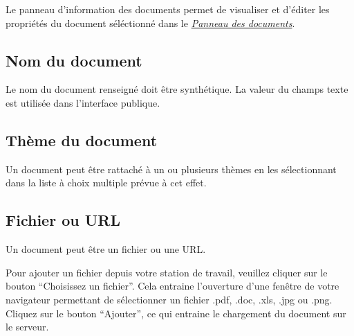 \documentclass[letterpaper,10pt,french]{sphinxmanual}
\begin{document}
Le panneau d'information des documents permet de visualiser et d'éditer les propriétés du document séléctionné dans le {\hyperref[documents/docslist::doc]{\emph{\emph{Panneau des documents}}}}.



\subsection{Nom du document}
\label{documents/infopanel:nom-du-document}
Le nom du document renseigné doit être synthétique. La valeur du champs texte est utilisée dans l'interface publique.


\subsection{Thème du document}
\label{documents/infopanel:theme-du-document}
Un document peut être rattaché à un ou plusieurs thèmes en les sélectionnant dans la liste à choix multiple prévue à cet effet.


\subsection{Fichier ou URL}
\label{documents/infopanel:fichier-ou-url}
Un document peut être un fichier ou une URL.

Pour ajouter un fichier depuis votre station de travail, veuillez cliquer sur le bouton ``Choisissez un fichier''. Cela entraine l'ouverture d'une fenêtre de votre navigateur permettant de sélectionner un fichier .pdf, .doc, .xls, .jpg ou .png. Cliquez sur le bouton ``Ajouter'', ce qui entraine le chargement du document sur le serveur.
\end{document}
